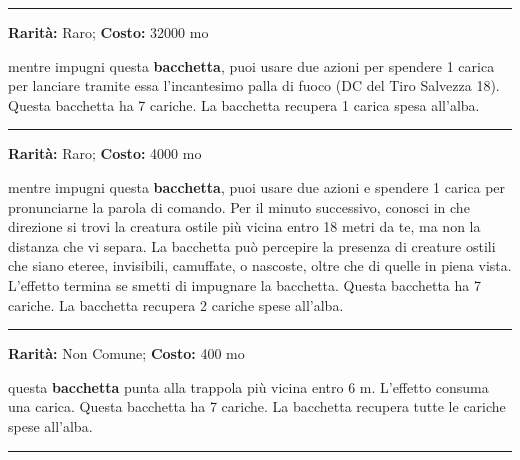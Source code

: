 \begin{multicols}{2}


\smallskip\noindent\rule{\linewidth}{2pt}  \hypertarget{BacchettadellePallediFuoco}{}\medskip{}\noindent\label{BacchettadellePallediFuoco}

\textbf{Rarità:} Raro; \textbf{Costo:} 32000 mo

mentre impugni questa \textbf{bacchetta}, puoi usare due azioni per spendere 1 carica per lanciare tramite essa l'incantesimo palla di fuoco (DC del Tiro Salvezza 18). Questa bacchetta ha 7 cariche. La bacchetta recupera 1 carica spesa all'alba.

\smallskip\noindent\rule{\linewidth}{2pt}  \hypertarget{BacchettadiIndivid.deiNemici}{}\medskip{}\noindent\label{BacchettadiIndivid.deiNemici}

\textbf{Rarità:} Raro; \textbf{Costo:} 4000 mo

mentre impugni questa \textbf{bacchetta}, puoi usare due azioni e spendere 1 carica per pronunciarne la parola di comando. Per il minuto successivo, conosci in che direzione si trovi la creatura ostile più vicina entro 18 metri da te, ma non la distanza che vi separa. La bacchetta può percepire la presenza di creature ostili che siano eteree, invisibili, camuffate, o nascoste, oltre che di quelle in piena vista. L'effetto termina se smetti di impugnare la bacchetta. Questa bacchetta ha 7 cariche. La bacchetta recupera 2 cariche spese all'alba.

\smallskip\noindent\rule{\linewidth}{2pt}  \hypertarget{BacchettaScopritrappole}{}\medskip{}\noindent\label{BacchettaScopritrappole}

\textbf{Rarità:} Non Comune; \textbf{Costo:} 400 mo

questa \textbf{bacchetta} punta alla trappola più vicina entro 6 m. L'effetto consuma una carica. Questa bacchetta ha 7 cariche. La bacchetta recupera tutte le cariche spese all'alba.

\smallskip\noindent\rule{\linewidth}{2pt}  \hypertarget{Bacinelladell'annegamento}{}\medskip{}\noindent\label{Bacinelladell'annegamento}


\end{multicols}
